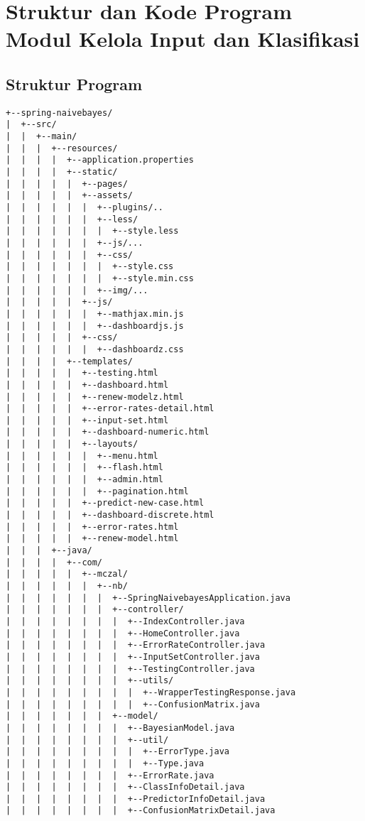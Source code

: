 \chapter{Struktur dan Kode Program Modul Kelola Input dan Klasifikasi}
\label{lamp:C}
\section{Struktur Program}
\begin{lstlisting}
+--spring-naivebayes/
|  +--src/
|  |  +--main/
|  |  |  +--resources/
|  |  |  |  +--application.properties
|  |  |  |  +--static/
|  |  |  |  |  +--pages/
|  |  |  |  |  +--assets/
|  |  |  |  |  |  +--plugins/..
|  |  |  |  |  |  +--less/
|  |  |  |  |  |  |  +--style.less
|  |  |  |  |  |  +--js/...
|  |  |  |  |  |  +--css/
|  |  |  |  |  |  |  +--style.css
|  |  |  |  |  |  |  +--style.min.css
|  |  |  |  |  |  +--img/...
|  |  |  |  |  +--js/
|  |  |  |  |  |  +--mathjax.min.js
|  |  |  |  |  |  +--dashboardjs.js
|  |  |  |  |  +--css/
|  |  |  |  |  |  +--dashboardz.css
|  |  |  |  +--templates/
|  |  |  |  |  +--testing.html
|  |  |  |  |  +--dashboard.html
|  |  |  |  |  +--renew-modelz.html
|  |  |  |  |  +--error-rates-detail.html
|  |  |  |  |  +--input-set.html
|  |  |  |  |  +--dashboard-numeric.html
|  |  |  |  |  +--layouts/
|  |  |  |  |  |  +--menu.html
|  |  |  |  |  |  +--flash.html
|  |  |  |  |  |  +--admin.html
|  |  |  |  |  |  +--pagination.html
|  |  |  |  |  +--predict-new-case.html
|  |  |  |  |  +--dashboard-discrete.html
|  |  |  |  |  +--error-rates.html
|  |  |  |  |  +--renew-model.html
|  |  |  +--java/
|  |  |  |  +--com/
|  |  |  |  |  +--mczal/
|  |  |  |  |  |  +--nb/
|  |  |  |  |  |  |  +--SpringNaivebayesApplication.java
|  |  |  |  |  |  |  +--controller/
|  |  |  |  |  |  |  |  +--IndexController.java
|  |  |  |  |  |  |  |  +--HomeController.java
|  |  |  |  |  |  |  |  +--ErrorRateController.java
|  |  |  |  |  |  |  |  +--InputSetController.java
|  |  |  |  |  |  |  |  +--TestingController.java
|  |  |  |  |  |  |  |  +--utils/
|  |  |  |  |  |  |  |  |  +--WrapperTestingResponse.java
|  |  |  |  |  |  |  |  |  +--ConfusionMatrix.java
|  |  |  |  |  |  |  +--model/
|  |  |  |  |  |  |  |  +--BayesianModel.java
|  |  |  |  |  |  |  |  +--util/
|  |  |  |  |  |  |  |  |  +--ErrorType.java
|  |  |  |  |  |  |  |  |  +--Type.java
|  |  |  |  |  |  |  |  +--ErrorRate.java
|  |  |  |  |  |  |  |  +--ClassInfoDetail.java
|  |  |  |  |  |  |  |  +--PredictorInfoDetail.java
|  |  |  |  |  |  |  |  +--ConfusionMatrixDetail.java

\end{lstlisting}
